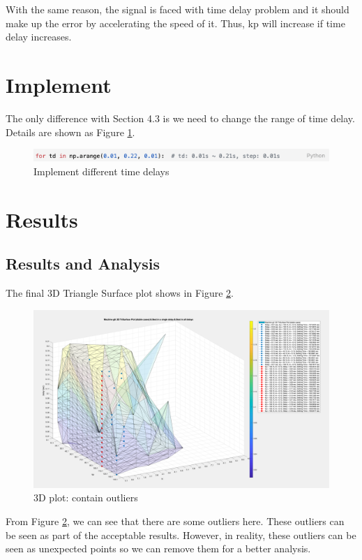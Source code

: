 \documentclass{report}
\begin{document}
With the same reason, the signal is faced with time delay problem and it should make up the error by accelerating the speed of it. Thus, kp will increase if time delay increases. \\

\section{Implement} %
The only difference with Section 4.3 is we need to change the range of time delay. Details are shown as Figure \textcolor{red}{\ref{5_3_code}}. \\

\begin{figure}[htbp]
\centering
\includegraphics[width = .999\textwidth]{figure/5_3_code.png}
\caption{Implement different time delays}
\label{5_3_code}
\end{figure}


\section{Results} %
\subsection{Results and Analysis} %
The final 3D Triangle Surface plot shows in Figure \textcolor{red}{\ref{5_4_1_Outlier}}.\\

\begin{figure}[htbp]
\centering
\includegraphics[width = .819\textwidth]{figure/5_4_1_Outlier.png}
\caption{3D plot: contain outliers}
\label{5_4_1_Outlier}
\end{figure}

From Figure \textcolor{red}{\ref{5_4_1_Outlier}}, we can see that there are some outliers here. These outliers can be seen as part of the acceptable results. However, in reality, these outliers can be seen as unexpected points so we can remove them for a better analysis.\\
\end{document}
